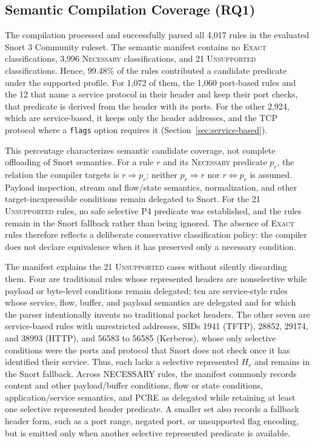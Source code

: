 \documentclass{article}
\begin{document}
\subsection{Semantic Compilation Coverage (RQ1)}
The compilation processed and successfully parsed all 4,017 rules in the
evaluated Snort 3 Community ruleset. The semantic manifest contains no
\textsc{Exact} classifications, 3,996 \textsc{Necessary} classifications,
and 21 \textsc{Unsupported} classifications. Hence, 99.48\% of the rules
contributed a candidate predicate under the supported profile. For 1,072 of
them, the 1,060 port-based rules and the 12 that name a service protocol in
their header and keep their port checks, that predicate is derived from the
header with its ports. For the other 2,924, which are service-based, it keeps only the
header addresses, and the TCP protocol where a \texttt{flags} option requires
it (Section~\ref{sec:service-based}).

This percentage characterizes semantic candidate coverage, not complete
offloading of Snort semantics. For a rule $r$ and its \textsc{Necessary}
predicate $p_r$, the relation the compiler targets is $r \Rightarrow p_r$;
neither $p_r \Rightarrow r$ nor $r \Leftrightarrow p_r$ is assumed. Payload
inspection, stream and flow/state semantics, normalization, and other
target-inexpressible conditions remain delegated to Snort. For the 21
\textsc{Unsupported} rules, no safe selective P4 predicate was established,
and the rules remain in the Snort fallback rather than being ignored. The
absence of \textsc{Exact} rules therefore reflects a deliberate conservative
classification policy: the compiler does not declare equivalence when it has
preserved only a necessary condition.

The manifest explains the 21 \textsc{Unsupported} cases without silently
discarding them. Four are traditional rules whose represented headers are
nonselective while payload or byte-level conditions remain delegated; ten
are service-style rules whose service, flow, buffer, and payload semantics
are delegated and for which the parser intentionally invents no traditional
packet headers. The other seven are service-based rules with unrestricted
addresses, SIDs 1941 (TFTP), 28852, 29174, and 38993 (HTTP), and 56583 to
56585 (Kerberos), whose only selective conditions were the ports and
protocol that Snort does not check once it has identified their service.
Thus, each lacks a selective represented $H_r$ and remains in the Snort
fallback. Across NECESSARY rules, the manifest commonly records content and
other payload/buffer conditions, flow or state conditions,
application/service semantics, and PCRE as delegated while retaining at
least one selective represented header predicate. A smaller set also records
a fallback header form, such as a port range, negated port, or unsupported
flag encoding, but is emitted only when another selective represented
predicate is available.
\end{document}
